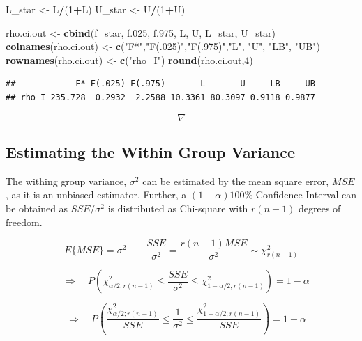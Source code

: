 \documentclass[
]{book}
\newenvironment{Shaded}{\begin{snugshade}}{\end{snugshade}}
\newcommand{\DecValTok}[1]{\textcolor[rgb]{0.00,0.00,0.81}{#1}}
\newcommand{\FloatTok}[1]{\textcolor[rgb]{0.00,0.00,0.81}{#1}}
\newcommand{\FunctionTok}[1]{\textcolor[rgb]{0.13,0.29,0.53}{\textbf{#1}}}
\newcommand{\NormalTok}[1]{#1}
\newcommand{\OtherTok}[1]{\textcolor[rgb]{0.56,0.35,0.01}{#1}}
\newcommand{\SpecialCharTok}[1]{\textcolor[rgb]{0.81,0.36,0.00}{\textbf{#1}}}
\newcommand{\StringTok}[1]{\textcolor[rgb]{0.31,0.60,0.02}{#1}}
\begin{document}
\begin{Shaded}
\begin{Highlighting}[]
\NormalTok{L\_star }\OtherTok{\textless{}{-}}\NormalTok{ L}\SpecialCharTok{/}\NormalTok{(}\DecValTok{1}\SpecialCharTok{+}\NormalTok{L)}
\NormalTok{U\_star }\OtherTok{\textless{}{-}}\NormalTok{ U}\SpecialCharTok{/}\NormalTok{(}\DecValTok{1}\SpecialCharTok{+}\NormalTok{U)}

\NormalTok{rho.ci.out }\OtherTok{\textless{}{-}} \FunctionTok{cbind}\NormalTok{(f\_star, f}\FloatTok{.025}\NormalTok{, f}\FloatTok{.975}\NormalTok{, L, U, L\_star, U\_star)}
\FunctionTok{colnames}\NormalTok{(rho.ci.out) }\OtherTok{\textless{}{-}} \FunctionTok{c}\NormalTok{(}\StringTok{"F*"}\NormalTok{,}\StringTok{"F(.025)"}\NormalTok{,}\StringTok{"F(.975)"}\NormalTok{,}\StringTok{"L"}\NormalTok{, }\StringTok{"U"}\NormalTok{, }\StringTok{"LB"}\NormalTok{, }\StringTok{"UB"}\NormalTok{)}
\FunctionTok{rownames}\NormalTok{(rho.ci.out) }\OtherTok{\textless{}{-}} \FunctionTok{c}\NormalTok{(}\StringTok{"rho\_I"}\NormalTok{)}
\FunctionTok{round}\NormalTok{(rho.ci.out,}\DecValTok{4}\NormalTok{)}
\end{Highlighting}
\end{Shaded}

\begin{verbatim}
##            F* F(.025) F(.975)       L       U     LB     UB
## rho_I 235.728  0.2932  2.2588 10.3361 80.3097 0.9118 0.9877
\end{verbatim}

\[\nabla \]

\subsection{Estimating the Within Group
Variance}\label{estimating-the-within-group-variance}

The withing group variance, \(\sigma^2\) can be estimated by the mean
square error, \(MSE\), as it is an unbiased estimator. Further, a
\((1-\alpha)100\%\) Confidence Interval can be obtained as
\(SSE/\sigma^2\) is distributed as Chi-square with \(r(n-1)\) degrees of
freedom.

\[
E\{MSE\}=\sigma^2 \qquad  \frac{SSE}{\sigma^2} =
\frac{r(n-1)MSE}{\sigma^2}\sim \chi_{r(n-1)}^2
\]

\[
\quad \Rightarrow \quad P\left(\chi_{\alpha/2;r(n-1)}^2 \leq \frac{SSE}{\sigma^2}
\leq \chi_{1-\alpha/2;r(n-1)}^2\right)=1-\alpha
\]

\[
\quad \Rightarrow \quad P\left(\frac{\chi_{\alpha/2;r(n-1)}^2}{SSE} \leq \frac{1}{\sigma^2}
\leq \frac{\chi_{1-\alpha/2;r(n-1)}^2}{SSE}\right)=1-\alpha
\]
\end{document}
